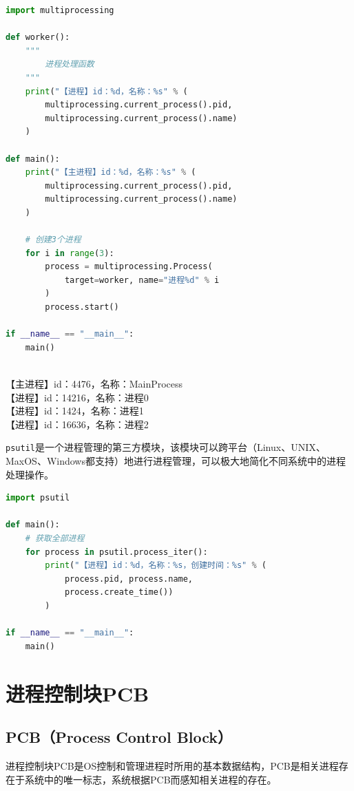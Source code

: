\begin{lstlisting}[language=Python, title=创建多进程]
import multiprocessing

def worker():
	"""
		进程处理函数
	"""
	print("【进程】id：%d，名称：%s" % (
		multiprocessing.current_process().pid,
		multiprocessing.current_process().name)
	)

def main():
	print("【主进程】id：%d，名称：%s" % (
		multiprocessing.current_process().pid,
		multiprocessing.current_process().name)
	)

	# 创建3个进程
	for i in range(3):
		process = multiprocessing.Process(
			target=worker, name="进程%d" % i
		)
		process.start()

if __name__ == "__main__":
	main()
\end{lstlisting}

\begin{tcolorbox}
	 \\
	【主进程】id：4476，名称：MainProcess \\
	【进程】id：14216，名称：进程0 \\
	【进程】id：1424，名称：进程1 \\
	【进程】id：16636，名称：进程2
\end{tcolorbox}

\lstinline|psutil|是一个进程管理的第三方模块，该模块可以跨平台（Linux、UNIX、MaxOS、Windows都支持）地进行进程管理，可以极大地简化不同系统中的进程处理操作。

\begin{lstlisting}[language=Python, title=获取全部进程信息]
import psutil

def main():
	# 获取全部进程
	for process in psutil.process_iter():
		print("【进程】id：%d，名称：%s，创建时间：%s" % (
			process.pid, process.name,
			process.create_time())
		)

if __name__ == "__main__":
	main()
\end{lstlisting}

\newpage

\section{进程控制块PCB}

\subsection{PCB（Process Control Block）}

进程控制块PCB是OS控制和管理进程时所用的基本数据结构，PCB是相关进程存在于系统中的唯一标志，系统根据PCB而感知相关进程的存在。 \\

